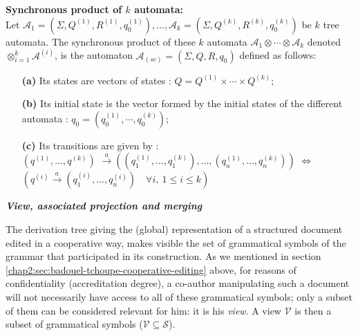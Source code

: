 \begin{definition}
\label{chap2:def:synchronous-product}
\textbf{Synchronous product of $k$ automata:}\\
Let $\mathcal{A}_1=\left(\Sigma,Q^{(1)},R^{(1)},q_{0}^{(1)}\right), \ldots , \mathcal{A}_k=\left(\Sigma,Q^{(k)},R^{(k)},q_{0}^{(k)}\right) $ be $k$ tree automata. The synchronous product of these $k$ automata $\mathcal{A}_1 \otimes \cdots \otimes \mathcal{A}_k$ denoted $\otimes_{i=1}^{k} \mathcal{A}^{(i)}$, is the automaton $\mathcal{A}_{(sc)}=(\Sigma,Q,R,q_{0})$ defined as follows: 
\begin{itemize}
	\item[\textbf{(a)}] Its states are vectors of states : $Q =Q^{(1)}\times\cdots\times Q^{(k)}$; 
	\item[\textbf{(b)}] Its initial state is the vector formed by the initial states of the different automata : $q_{0}=\left(q_{0}^{(1)},\cdots, q_{0}^{(k)}\right)$; 
	\item[\textbf{(c)}] Its transitions are given by :\\
				$\left(q^{(1)}, \ldots, q^{(k)}\right)$ $\stackrel{a}{\rightarrow}\left(\left(q^{(1)}_1,\ldots,q^{(k)}_1\right),\ldots,\left(q^{(1)}_n,\ldots,q^{(k)}_n\right)\right)$ $\Leftrightarrow$\\ 
				   $\left( q^{(i)}\stackrel{a}{\rightarrow}\left(q^{(i)}_1,\ldots,q^{(i)}_n\right) \quad \forall i,~ 1\leq i\leq k \right)$
\end{itemize}
\end {definition}

\label{chap2:sec:view-projection-expansion-merging}
\noindent\textbf{\textit{View, associated projection and merging}}

The derivation tree giving the (global) representation of a structured document edited in a cooperative way, makes visible the set of grammatical symbols of the grammar that participated in its construction. As we mentioned in section \ref{chap2:sec:badouel-tchoupe-cooperative-editing} above, for reasons of confidentiality (accreditation degree), a co-author manipulating such a document will not necessarily have access to all of these grammatical symbols; only a subset of them can be considered relevant for him: it is his \textit{view}. A view $\mathcal{V}$ is then a subset of grammatical symbols ($\mathcal{V} \subseteq \mathcal{S}$). 

